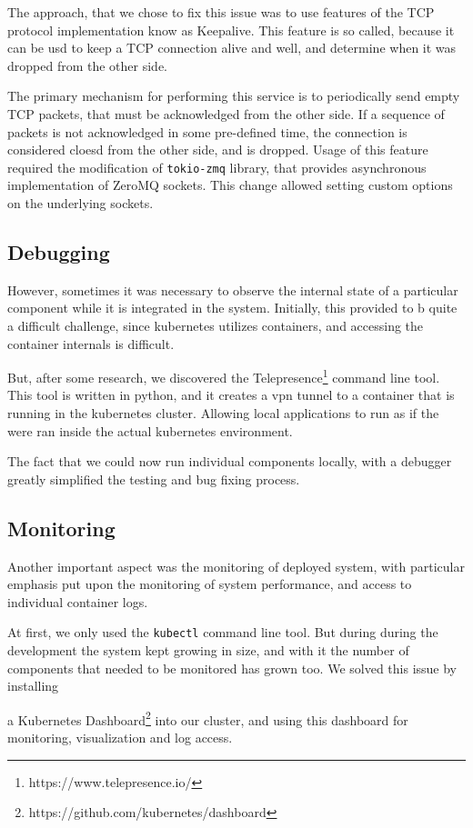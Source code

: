 The approach, that we chose to fix this issue was to use features of the TCP protocol implementation know as Keepalive.
This feature is so called, because it can be usd to keep a TCP connection alive and well, and determine when it was dropped from the other side.

The primary mechanism for performing this service is to periodically send empty TCP packets, that must be acknowledged from
the other side. If a sequence of packets is not acknowledged in some pre-defined time, the connection is considered cloesd
from the other side, and is dropped. Usage of this feature required the modification of \verb|tokio-zmq| library, that provides
asynchronous implementation
of ZeroMQ sockets. This change allowed setting custom options on the underlying sockets.

\subsection{Debugging}
However, sometimes it was necessary to observe the internal state of a particular component while it is integrated in the system.
Initially, this provided to b quite a difficult challenge, since kubernetes utilizes containers, and accessing the container
internals is difficult.

But, after some research, we discovered the Telepresence\footnote{https://www.telepresence.io/} command line tool. This tool is written in python,
and it creates a vpn tunnel to a container that is running in the kubernetes cluster. Allowing local applications to run as if
the were ran inside the actual kubernetes environment.

The fact that we could now run individual components locally, with a debugger greatly simplified the testing and bug fixing process.

\subsection{Monitoring}
Another important aspect was the monitoring of deployed system, with particular emphasis put upon
the monitoring of system performance, and access to individual container logs.

At first, we only used the \verb|kubectl| command line tool. But during during the development the system kept growing
in size, and with it the number of components that needed to be monitored has grown too. We solved this issue by installing

a Kubernetes Dashboard\footnote{https://github.com/kubernetes/dashboard} into our cluster, and using this dashboard for monitoring, visualization and log access.

